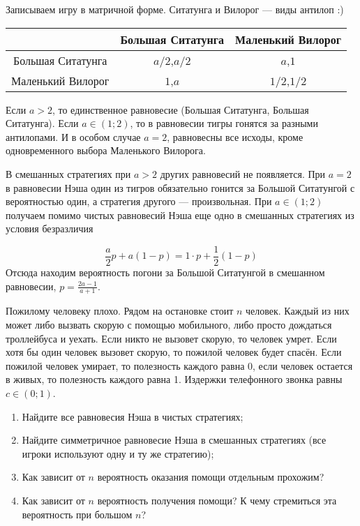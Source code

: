 \begin{solution}
Записываем игру в матричной форме. Ситатунга и Вилорог --- виды антилоп :)

\begin{tabular}{c|cc}
 & Большая Ситатунга & Маленький Вилорог \\ 
\hline 
Большая Ситатунга & $a/2$,$a/2$ & $a$,$1$ \\ 
Маленький Вилорог & $1$,$a$ & $1/2$,$1/2$ 
\end{tabular} 

Если $a>2$, то единственное равновесие (Большая Ситатунга, Большая Ситатунга). Если $a \in (1;2)$, то в равновесии тигры гонятся за разными антилопами. И в особом случае $a=2$, равновесны все исходы, кроме одновременного выбора Маленького Вилорога.

В смешанных стратегиях при $a>2$ других равновесий не появляется. При $a=2$ в равновесии Нэша один из тигров обязательно гонится за Большой Ситатунгой с вероятностью один, а стратегия другого --- произвольная. При $a\in (1;2)$ получаем помимо чистых равновесий Нэша еще одно в смешанных стратегиях из условия безразличия

\[
\frac{a}{2}p+a(1-p)=1\cdot p + \frac{1}{2}(1-p)
\]
Отсюда находим вероятность погони за Большой Ситатунгой в смешанном равновесии, $p=\frac{2a-1}{a+1}$.
\end{solution}


\begin{problem}
Пожилому человеку плохо. Рядом на остановке стоит $n$  человек. Каждый из них может либо вызвать скорую с помощью мобильного, либо просто дождаться троллейбуса и уехать. Если никто не вызовет скорую, то человек умрет. Если хотя бы один человек вызовет скорую, то пожилой человек будет спасён. Если пожилой человек умирает, то полезность каждого равна 0, если человек остается в живых, то полезность каждого равна 1. Издержки телефонного звонка равны  $c\in \left(0;1\right)$.
\begin{enumerate}
\item  Найдите все равновесия Нэша в чистых стратегиях;
\item  Найдите симметричное равновесие Нэша в смешанных стратегиях (все игроки используют одну и ту же стратегию);
\item  Как зависит от  $n$  вероятность оказания помощи отдельным прохожим?
\item Как зависит от  $n$  вероятность получения помощи? К чему стремиться эта вероятность при большом $n$?
\end{enumerate}
\end{problem}

